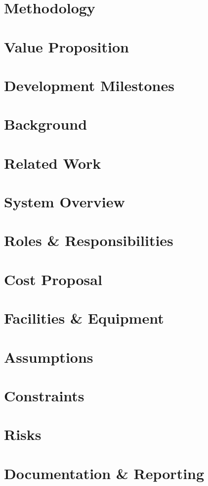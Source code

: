 \documentclass[11pt,letterpaper]{article}
\begin{document}
\section{Methodology}

\section{Value Proposition}

\section{Development Milestones}

\newpage

\section{Background}

\section{Related Work}

\section{System Overview}

\section{Roles \& Responsibilities}

\section{Cost Proposal}

\section{Facilities \& Equipment}

\section{Assumptions}

\section{Constraints}

\section{Risks}

\section{Documentation \& Reporting}

\newpage



{}
\end{document}
